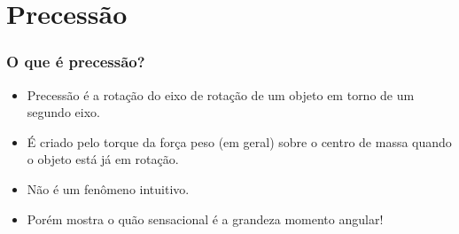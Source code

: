 \documentclass{beamer}
\begin{document}



\iffalse


\section{Precessão} 


\begin{frame}
\frametitle{O que é precessão?}
\begin{itemize}
\item Precessão é a rotação do eixo de rotação de um objeto em torno de um segundo eixo.
\item É criado pelo torque da força peso (em geral) sobre o centro de massa quando o objeto está já em rotação. 
\pause
\item Não é um fenômeno intuitivo.
\item Porém mostra o quão sensacional é a grandeza momento angular!
\end{itemize}
\end{frame}
\end{document}
